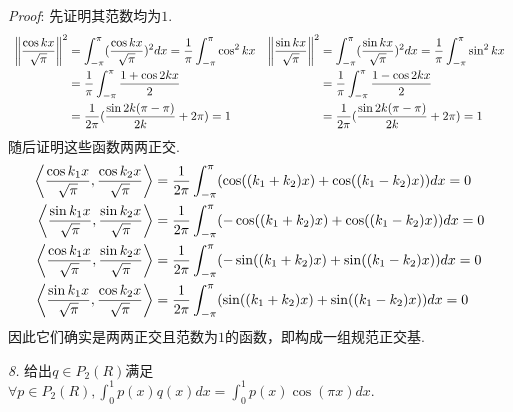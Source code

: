 \textit{Proof}:
先证明其范数均为\(1\).
    \begin{equation*}
        \begin{array}{cc}
            \begin{aligned}
                \left\lVert \dfrac{\cos kx}{\sqrt{\pi}} \right\rVert^2 &= \int_{-\pi}^{\pi}(\dfrac{\cos kx}{\sqrt{\pi}})^2dx
                =\dfrac{1}{\pi} \int_{-\pi}^{\pi} \cos^2 kx \\
                &=\dfrac{1}{\pi} \int_{-\pi}^{\pi} \dfrac{1+\cos 2kx}{2} \\
                &=\dfrac{1}{2\pi}(\dfrac{\sin 2k(\pi-\pi)}{2k}+2\pi)=1
            \end{aligned}
            &
            \begin{aligned}
                \left\lVert \dfrac{\sin kx}{\sqrt{\pi}} \right\rVert^2 &= \int_{-\pi}^{\pi}(\dfrac{\sin kx}{\sqrt{\pi}})^2dx
                =\dfrac{1}{\pi} \int_{-\pi}^{\pi} \sin^2 kx \\
                &=\dfrac{1}{\pi} \int_{-\pi}^{\pi} \dfrac{1-\cos 2kx}{2} \\
                &=\dfrac{1}{2\pi}(\dfrac{\sin 2k(\pi-\pi)}{2k}+2\pi)=1
            \end{aligned}
        \end{array}
    \end{equation*}
随后证明这些函数两两正交.
    \begin{align*}
        \left\langle \dfrac{\cos k_1x}{\sqrt{\pi}},\dfrac{\cos k_2x}{\sqrt{\pi}} \right\rangle&
        =\dfrac{1}{2\pi} \int_{-\pi}^{\pi}(\cos((k_1+k_2)x)+\cos((k_1-k_2)x))dx=0 \\
        \left\langle \dfrac{\sin k_1x}{\sqrt{\pi}},\dfrac{\sin k_2x}{\sqrt{\pi}} \right\rangle&
        =\dfrac{1}{2\pi} \int_{-\pi}^{\pi}(-\cos((k_1+k_2)x)+\cos((k_1-k_2)x))dx=0 \\
        \left\langle \dfrac{\cos k_1x}{\sqrt{\pi}},\dfrac{\sin k_2x}{\sqrt{\pi}} \right\rangle&
        =\dfrac{1}{2\pi} \int_{-\pi}^{\pi}(-\sin((k_1+k_2)x)+\sin((k_1-k_2)x))dx=0 \\
        \left\langle \dfrac{\sin k_1x}{\sqrt{\pi}},\dfrac{\cos k_2x}{\sqrt{\pi}} \right\rangle&
        =\dfrac{1}{2\pi} \int_{-\pi}^{\pi}(\sin((k_1+k_2)x)+\sin((k_1-k_2)x))dx=0 \\
    \end{align*}
因此它们确实是两两正交且范数为\(1\)的函数，即构成一组规范正交基.

\newpage

\textit{8.}
给出\(q \in P_2(R)\)满足\(\forall p \in P_2(R),\int_{0}^{1} p(x)q(x)dx=\int_{0}^{1} p(x)\cos(\pi x)dx\).

